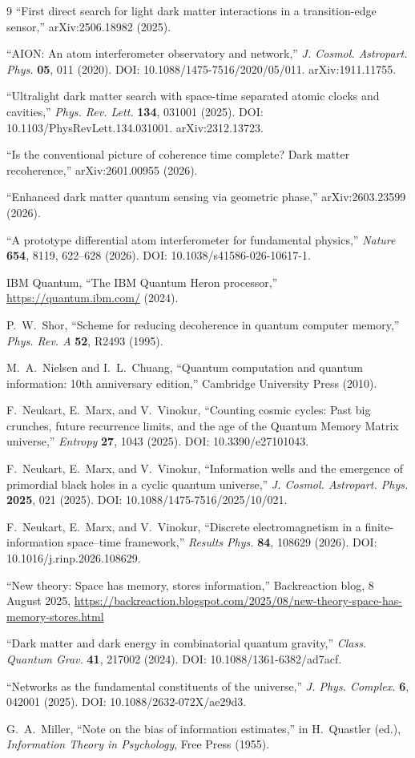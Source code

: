 \documentclass[12pt,a4paper]{article}
\begin{document}
\begin{thebibliography}{9}
``First direct search for light dark matter interactions in a transition-edge sensor,''
arXiv:2506.18982 (2025).

``AION: An atom interferometer observatory and network,''
\textit{J. Cosmol. Astropart. Phys.} \textbf{05}, 011 (2020).
DOI: 10.1088/1475-7516/2020/05/011. arXiv:1911.11755.

``Ultralight dark matter search with space-time separated atomic clocks and cavities,''
\textit{Phys. Rev. Lett.} \textbf{134}, 031001 (2025).
DOI: 10.1103/PhysRevLett.134.031001. arXiv:2312.13723.

``Is the conventional picture of coherence time complete? Dark matter recoherence,''
arXiv:2601.00955 (2026).

``Enhanced dark matter quantum sensing via geometric phase,''
arXiv:2603.23599 (2026).

``A prototype differential atom interferometer for fundamental physics,''
\textit{Nature} \textbf{654}, 8119, 622--628 (2026).
DOI: 10.1038/s41586-026-10617-1.

IBM Quantum,
``The IBM Quantum Heron processor,''
\url{https://quantum.ibm.com/} (2024).

P.~W.~Shor,
``Scheme for reducing decoherence in quantum computer memory,''
\textit{Phys. Rev. A} \textbf{52}, R2493 (1995).

M.~A.~Nielsen and I.~L.~Chuang,
``Quantum computation and quantum information: 10th anniversary edition,''
Cambridge University Press (2010).

F.~Neukart, E.~Marx, and V.~Vinokur,
``Counting cosmic cycles: Past big crunches, future recurrence limits, and the age of the Quantum Memory Matrix universe,''
\textit{Entropy} \textbf{27}, 1043 (2025).
DOI: 10.3390/e27101043.

F.~Neukart, E.~Marx, and V.~Vinokur,
``Information wells and the emergence of primordial black holes in a cyclic quantum universe,''
\textit{J. Cosmol. Astropart. Phys.} \textbf{2025}, 021 (2025).
DOI: 10.1088/1475-7516/2025/10/021.

F.~Neukart, E.~Marx, and V.~Vinokur,
``Discrete electromagnetism in a finite-information space--time framework,''
\textit{Results Phys.} \textbf{84}, 108629 (2026).
DOI: 10.1016/j.rinp.2026.108629.

``New theory: Space has memory, stores information,''
Backreaction blog, 8 August 2025,
\url{https://backreaction.blogspot.com/2025/08/new-theory-space-has-memory-stores.html}

``Dark matter and dark energy in combinatorial quantum gravity,''
\textit{Class. Quantum Grav.} \textbf{41}, 217002 (2024).
DOI: 10.1088/1361-6382/ad7acf.

``Networks as the fundamental constituents of the universe,''
\textit{J. Phys. Complex.} \textbf{6}, 042001 (2025).
DOI: 10.1088/2632-072X/ae29d3.

G.~A.~Miller,
``Note on the bias of information estimates,''
in H.~Quastler (ed.), \textit{Information Theory in Psychology}, Free Press (1955).

\end{thebibliography}
\end{document}
